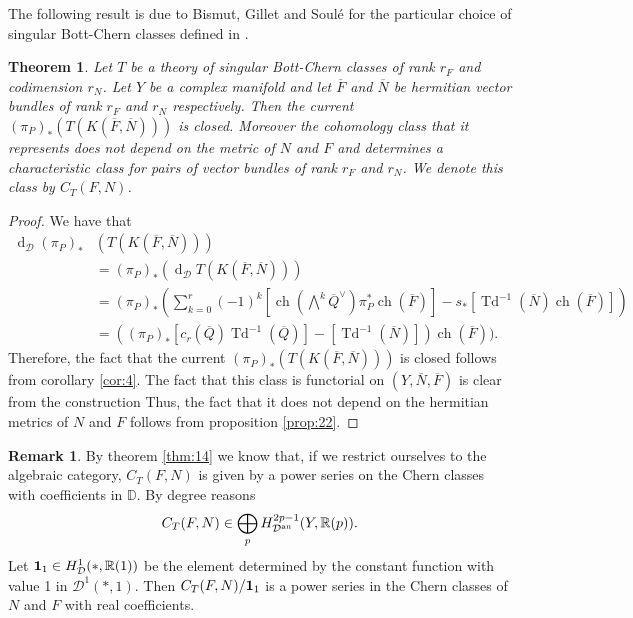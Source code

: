 \documentclass[10pt,twoside]{article}
\numberwithin{equation}{section}
\theoremstyle{plain}
\newtheorem{theorem}[equation]{Theorem}
\theoremstyle{definition}
\newtheorem{remark}[equation]{Remark}
\DeclareMathOperator{\Td}{Td}
\DeclareMathOperator{\dd}{d}
\DeclareMathOperator{\ch}{ch}
\newcommand{\an}{\text{{\rm an}}}
\begin{document}
The following result is due to Bismut, Gillet and Soul\'e for the
particular choice of singular Bott-Chern classes defined in
\cite{BismutGilletSoule:MR1086887}. 

\begin{theorem} \label{thm:8} Let $T$ be a theory of singular
  Bott-Chern classes of
  rank $r_{F}$ and codimension $r_{N}$. Let $Y$ be a complex
  manifold 
  and let $\overline F$ and $\overline N$ be hermitian vector bundles
  of rank $r_{F}$ and 
  $r_{N}$ respectively. Then 
  the current $(\pi _{P})_{\ast}(T(K(\overline F,\overline N)))$ is
  closed. Moreover the 
  cohomology class that it represents does not depend on the metric of
  $N$ and $F$ and determines a characteristic class for pairs of
  vector bundles of rank $r_{F}$ and $r_{N}$. We denote this class by
  $C_{T}(F,N)$.
\end{theorem}
\begin{proof}
  We have that
  \begin{align*}
    \dd_{\mathcal{D}}(\pi _{P})_{\ast}&(T(K(\overline
    F,\overline N)))\\
    &=(\pi _{P})_{\ast}(\dd_{\mathcal{D}}T(K(\overline
    F,\overline N)))\\
    &=(\pi _{P})_{\ast}\left(\sum_{k=0}^{r}(-1)^{k}[\ch(
    \bigwedge^{k}\overline Q^{\vee})\pi _{P}^{\ast}\ch(\overline
    F)]-s_{\ast}[\Td^{-1}(\overline N)\ch(\overline F)]\right)\\
    &=\left((\pi _{P})_{\ast}[c_{r}(\overline
      Q)\Td^{-1}(\overline Q)]-[\Td^{-1}(\overline N)]
    \right)\ch(\overline F)).
  \end{align*}
  Therefore, the fact that the current $(\pi _{P})_{\ast}(T(K(\overline
  F,\overline N)))$ is closed follows from corollary \ref{cor:4}.
  The fact that this class is functorial on $(Y,\overline N,\overline
  F)$ is clear from the construction Thus, the fact that it does not
  depend on the hermitian metrics of $N$ and $F$ follows from
  proposition \ref{prop:22}.
\end{proof}

\begin{remark}
  By theorem \ref{thm:14} we know that, if we restrict ourselves to
  the algebraic category, $C_{T}(F,N)$ is given by a
  power series on the Chern classes with coefficients in
  $\mathbb{D}$. By degree reasons
  \begin{displaymath}
    C_{T}(F,N)\in
    \bigoplus_{p}H_{\mathcal{D}^{\an}}^{2p-1}(Y,\mathbb{R}(p)). 
  \end{displaymath}
  Let ${\bf 1}_{1}\in H^{1}_{\mathcal{D}}(\ast,\mathbb{R}(1))$ be the
  element determined by the constant function with value 1 in
  $\mathcal{D}^{1}(\ast,1)$. Then $C_{T}(F,N)/{\bf 1}_{1}$ is a power
  series in  the Chern
  classes of $N$ and $F$ with real coefficients.   
\end{remark}
\end{document}
